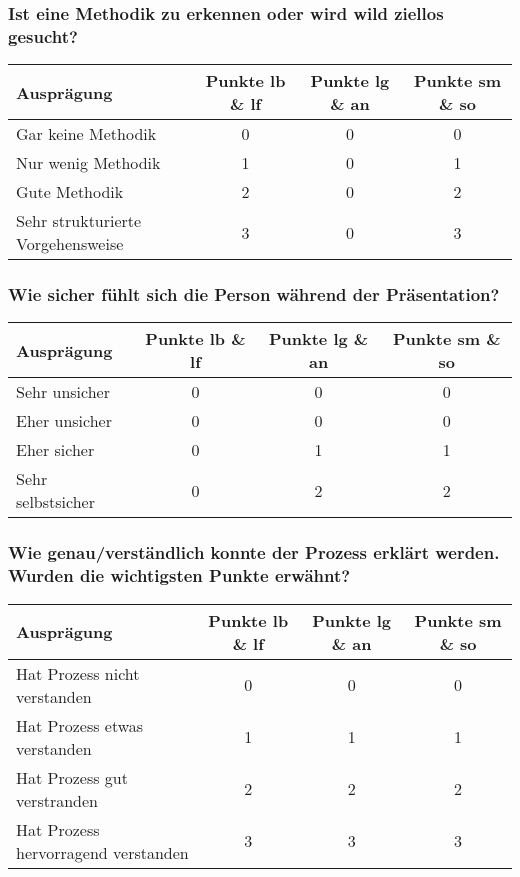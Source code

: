 \subsubsection{Ist eine Methodik zu erkennen oder wird wild ziellos gesucht?}
\begin{tabular}{| l | c | c | c |}
  \hline	
  \textbf{Ausprägung} & \textbf{Punkte lb \& lf} & \textbf{Punkte lg \& an} & \textbf{Punkte sm \& so} \\
  \hline  		
  Gar keine Methodik & 0  & 0 & 0 \\ 
  \hline
  Nur wenig Methodik & 1 & 0 & 1 \\ 
  \hline
  Gute Methodik & 2 & 0 & 2 \\
  \hline  
  Sehr strukturierte Vorgehensweise & 3 & 0 &  3 \\
  \hline  
\end{tabular}

\subsubsection{Wie sicher fühlt sich die Person während der Präsentation?}
\begin{tabular}{| l | c | c | c |}
  \hline	
  \textbf{Ausprägung} & \textbf{Punkte lb \& lf} & \textbf{Punkte lg \& an} & \textbf{Punkte sm \& so} \\
  \hline  		
  Sehr unsicher & 0  & 0 & 0 \\ 
  \hline
  Eher unsicher & 0 & 0 & 0 \\ 
  \hline
  Eher sicher & 0 & 1 & 1 \\
  \hline  
  Sehr selbstsicher & 0 & 2 &  2 \\
  \hline  
\end{tabular}

\subsubsection{Wie genau/verständlich konnte der Prozess erklärt werden. Wurden die wichtigsten Punkte erwähnt?}
\begin{tabular}{| l | c | c | c |}
  \hline	
  \textbf{Ausprägung} & \textbf{Punkte lb \& lf} & \textbf{Punkte lg \& an} & \textbf{Punkte sm \& so} \\
  \hline  		
  Hat Prozess nicht verstanden & 0  & 0 & 0 \\ 
  \hline
  Hat Prozess etwas verstanden & 1 & 1 & 1 \\ 
  \hline
  Hat Prozess gut verstranden & 2 & 2 & 2 \\
  \hline  
  Hat Prozess hervorragend verstanden & 3 & 3 &  3 \\
  \hline  
\end{tabular}

